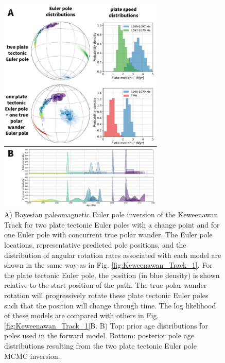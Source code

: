 \documentclass[11pt,letterpaper]{article}
\begin{document}
\begin{figure}
\centering
\includegraphics[width=0.7\textwidth]{fig_Keweenawan_2.pdf}
\caption{A) Bayesian paleomagnetic Euler pole inversion of the Keweenawan Track for two plate tectonic Euler poles with a change point and for one Euler pole with concurrent true polar wander. The Euler pole locations, representative predicted pole positions, and the distribution of angular rotation rates associated with each model are shown in the same way as in Fig. \ref{fig:Keweenawan_Track_1}. For the plate tectonic Euler pole, the position (in blue density) is shown relative to the start position of the path. The true polar wander rotation will progressively rotate these plate tectonic Euler poles such that the position will change through time. The log likelihood of these models are compared with others in Fig. \ref{fig:Keweenawan_Track_1}B. B) Top: prior age distributions for poles used in the forward model. Bottom: posterior pole age distributions resulting from the two plate tectonic Euler pole MCMC inversion.}
\label{fig:Keweenawan_Track_2}
\end{figure}
\end{document}
